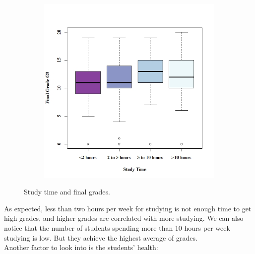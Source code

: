 \documentclass[a4paper, 11pt]{article}
\begin{document}
\begin{figure}[h!]
\begin{subfigure}[b]{0.4\linewidth}
			\includegraphics[width=1.5\linewidth]{study_time_grades.jpeg}
		\end{subfigure}
		\caption*{Study time and final grades.}
		\label{fig:study_time_grades}
	\end{figure}
	
	As expected, less than two hours per week for studying is not enough time to get high grades, and higher grades are correlated with more studying. We can also notice that the number of students spending more than 10 hours per week studying is low. But they achieve the highest average of grades.
	\\
	Another factor to look into is the students' health:
	
\end{document}
